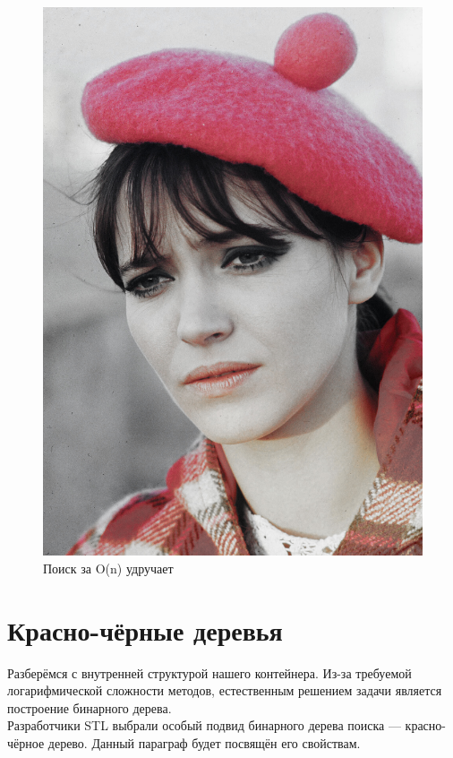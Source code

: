 \documentclass{article}
\begin{document}
\begin{center}
    \begin{figure}[h]
        \centering
        \includegraphics[scale = 0.125]{pictures/annakarinafinal.jpg}
        \caption*{Поиск за O(n) удручает}
    \end{figure}
    \caption{Поиск за O(n) удручает}
\end{center}

\newpage

\section{Красно-чёрные деревья}
Разберёмся с внутренней структурой нашего контейнера. Из-за требуемой логарифмической сложности методов, естественным решением задачи является построение бинарного дерева.\\
Разработчики STL выбрали особый подвид бинарного дерева поиска --- красно-чёрное дерево. Данный параграф будет посвящён его свойствам.\\
\end{document}
